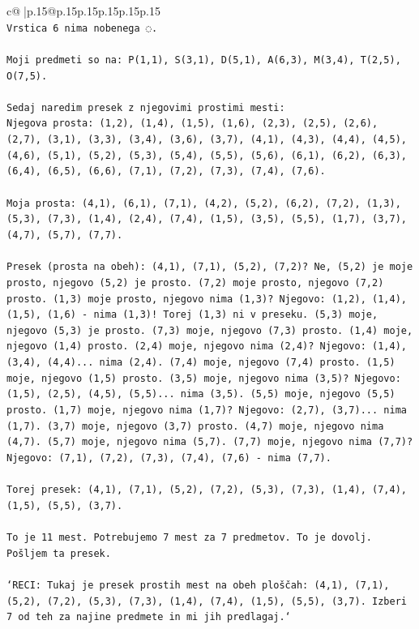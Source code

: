 \documentclass{article}
\begin{document}
{\begin{supertabular}{c@{$\;$}|p{.15\linewidth}@{}p{.15\linewidth}p{.15\linewidth}p{.15\linewidth}p{.15\linewidth}p{.15\linewidth}}
{{{\\ 
\texttt{Vrstica 6 nima nobenega ◌.} \\
\\ 
\texttt{Moji predmeti so na: P(1,1), S(3,1), D(5,1), A(6,3), M(3,4), T(2,5), O(7,5).} \\
\\ 
\texttt{Sedaj naredim presek z njegovimi prostimi mesti:} \\
\texttt{Njegova prosta: (1,2), (1,4), (1,5), (1,6), (2,3), (2,5), (2,6), (2,7), (3,1), (3,3), (3,4), (3,6), (3,7), (4,1), (4,3), (4,4), (4,5), (4,6), (5,1), (5,2), (5,3), (5,4), (5,5), (5,6), (6,1), (6,2), (6,3), (6,4), (6,5), (6,6), (7,1), (7,2), (7,3), (7,4), (7,6).} \\
\\ 
\texttt{Moja prosta: (4,1), (6,1), (7,1), (4,2), (5,2), (6,2), (7,2), (1,3), (5,3), (7,3), (1,4), (2,4), (7,4), (1,5), (3,5), (5,5), (1,7), (3,7), (4,7), (5,7), (7,7).} \\
\\ 
\texttt{Presek (prosta na obeh): (4,1), (7,1), (5,2), (7,2)? Ne, (5,2) je moje prosto, njegovo (5,2) je prosto. (7,2) moje prosto, njegovo (7,2) prosto. (1,3) moje prosto, njegovo nima (1,3)? Njegovo: (1,2), (1,4), (1,5), (1,6) {-} nima (1,3)! Torej (1,3) ni v preseku. (5,3) moje, njegovo (5,3) je prosto. (7,3) moje, njegovo (7,3) prosto. (1,4) moje, njegovo (1,4) prosto. (2,4) moje, njegovo nima (2,4)? Njegovo: (1,4), (3,4), (4,4)... nima (2,4). (7,4) moje, njegovo (7,4) prosto. (1,5) moje, njegovo (1,5) prosto. (3,5) moje, njegovo nima (3,5)? Njegovo: (1,5), (2,5), (4,5), (5,5)... nima (3,5). (5,5) moje, njegovo (5,5) prosto. (1,7) moje, njegovo nima (1,7)? Njegovo: (2,7), (3,7)... nima (1,7). (3,7) moje, njegovo (3,7) prosto. (4,7) moje, njegovo nima (4,7). (5,7) moje, njegovo nima (5,7). (7,7) moje, njegovo nima (7,7)? Njegovo: (7,1), (7,2), (7,3), (7,4), (7,6) {-} nima (7,7).} \\
\\ 
\texttt{Torej presek: (4,1), (7,1), (5,2), (7,2), (5,3), (7,3), (1,4), (7,4), (1,5), (5,5), (3,7).} \\
\\ 
\texttt{To je 11 mest. Potrebujemo 7 mest za 7 predmetov. To je dovolj. Pošljem ta presek.} \\
\\ 
\texttt{`RECI: Tukaj je presek prostih mest na obeh ploščah: (4,1), (7,1), (5,2), (7,2), (5,3), (7,3), (1,4), (7,4), (1,5), (5,5), (3,7). Izberi 7 od teh za najine predmete in mi jih predlagaj.`} \\
            }
        }
    }
     \\ \\


\end{supertabular}}
\end{document}

